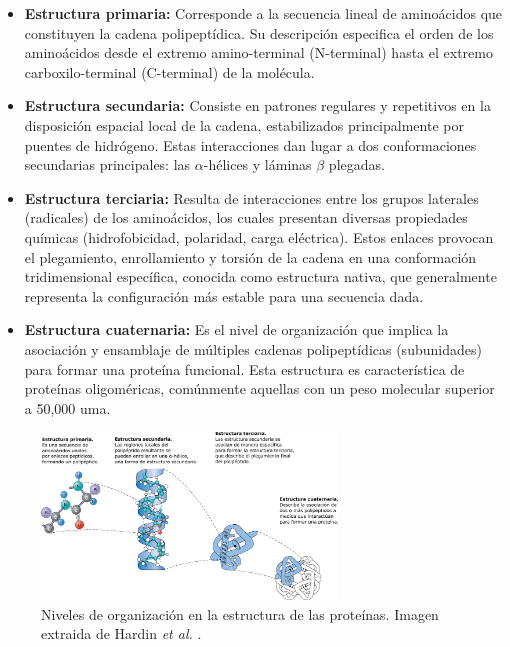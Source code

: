 \begin{itemize}


	\item \textbf{Estructura primaria:} Corresponde a la secuencia lineal de amino\'{a}cidos que constituyen la cadena polipept\'{i}dica. Su descripci\'{o}n especifica el orden de los amino\'{a}cidos desde el extremo amino-terminal (N-terminal) hasta el extremo carboxilo-terminal (C-terminal) de la mol\'{e}cula.
	
	\item \textbf{Estructura secundaria:} Consiste en patrones regulares y repetitivos en la disposici\'{o}n espacial local de la cadena, estabilizados principalmente por puentes de hidr\'{o}geno. Estas interacciones dan lugar a dos conformaciones secundarias principales: las $\alpha$-h\'{e}lices y l\'{a}minas $\beta$ plegadas.
	
	\item \textbf{Estructura terciaria:} Resulta de interacciones entre los grupos laterales (radicales) de los amino\'{a}cidos, los cuales presentan diversas propiedades qu\'{i}micas  (hidrofobicidad, polaridad, carga el\'{e}ctrica). Estos enlaces provocan el plegamiento, enrollamiento y torsi\'{o}n de la cadena en una conformaci\'{o}n tridimensional espec\'{i}fica, conocida como estructura nativa, que generalmente representa la configuraci\'{o}n m\'{a}s estable para una secuencia dada.
	
	\item \textbf{Estructura cuaternaria:} Es el nivel de organizaci\'{o}n que implica la asociaci\'{o}n y ensamblaje de m\'{u}ltiples cadenas polipept\'{i}dicas (subunidades) para formar una prote\'{i}na funcional. Esta estructura es caracter\'{i}stica de prote\'{i}nas oligom\'{e}ricas, com\'{u}nmente aquellas con un peso molecular superior a 50,000 uma.
\end{itemize}

\begin{figure}[H]
	\centering
	\includegraphics[width=0.7\textwidth]{graphs/niveles.pdf}
	\caption{Niveles de organizaci\'{o}n en la estructura de las prote\'{i}nas. Imagen extraida de Hardin \textit{et al.} \cite{Hardin2022}.}
	\label{fig:nivelesP}
\end{figure}

